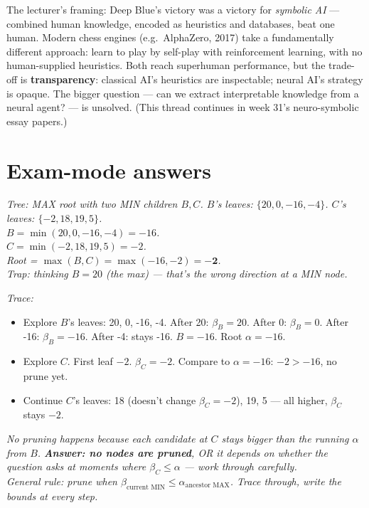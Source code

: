 \documentclass[11pt, a4paper]{article}
\begin{document}
\begin{notebox}
The lecturer's framing: Deep Blue's victory was a victory for \emph{symbolic AI} — combined human knowledge, encoded as heuristics and databases, beat one human. Modern chess engines (e.g.\ AlphaZero, 2017) take a fundamentally different approach: learn to play by self-play with reinforcement learning, with no human-supplied heuristics. Both reach superhuman performance, but the trade-off is \textbf{transparency}: classical AI's heuristics are inspectable; neural AI's strategy is opaque. The bigger question — can we extract interpretable knowledge from a neural agent? — is unsolved. (This thread continues in week 31's neuro-symbolic essay papers.)
\end{notebox}

\section{Exam-mode answers}

\begin{exambox}
\textit{Tree: MAX root with two MIN children $B, C$. $B$'s leaves: $\{20, 0, -16, -4\}$. $C$'s leaves: $\{-2, 18, 19, 5\}$.}\\[0.3em]
\textit{$B = \min(20, 0, -16, -4) = -16$.}\\
\textit{$C = \min(-2, 18, 19, 5) = -2$.}\\
\textit{Root = $\max(B, C) = \max(-16, -2) = \boldsymbol{-2}$.}\\[0.3em]
\textit{Trap: thinking $B = 20$ (the max) — that's the wrong direction at a MIN node.}
\end{exambox}

\begin{exambox}
\textit{Trace:}
\begin{itemize}[leftmargin=*, itemsep=0pt, topsep=0pt]
  \item Explore $B$'s leaves: 20, 0, -16, -4. After 20: $\beta_B = 20$. After 0: $\beta_B = 0$. After -16: $\beta_B = -16$. After -4: stays -16. $B = -16$. Root $\alpha = -16$.
  \item Explore $C$. First leaf $-2$. $\beta_C = -2$. Compare to $\alpha = -16$: $-2 > -16$, no prune yet.
  \item Continue $C$'s leaves: 18 (doesn't change $\beta_C = -2$), 19, 5 — all higher, $\beta_C$ stays $-2$.
\end{itemize}
\textit{No pruning happens because each candidate at $C$ stays bigger than the running $\alpha$ from $B$. \textbf{Answer: no nodes are pruned}, OR it depends on whether the question asks at moments where $\beta_C \le \alpha$ — work through carefully.}\\[0.3em]
\textit{General rule: prune when $\beta_{\text{current MIN}} \le \alpha_{\text{ancestor MAX}}$. Trace through, write the bounds at every step.}
\end{exambox}
\end{document}
